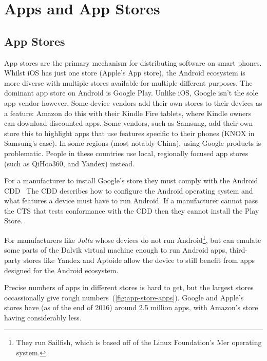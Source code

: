 \documentclass[thesis.tex]{subfiles}
\begin{document}
\chapter{Apps and App Stores}
\label{chap:apps-and-stores}

\section{App Stores}

App stores are the primary mechanism for distributing software on smart phones.
Whilst iOS has just one store (Apple's App store), the Android ecosystem is more diverse with multiple stores available for multiple different purposes.
The dominant app store on Android is Google Play. 
Unlike iOS, Google isn't the sole app vendor however.
Some device vendors add their own stores to their devices as a feature:
Amazon do this with their Kindle Fire tablets, where Kindle owners can download discounted apps.
Some vendors, such as Samsung, add their own store this to highlight apps that use features specific to their phones (KNOX in Samsung's case).
In some regions (most notably China), using Google products is problematic. People in these countries use local, regionally focused app stores (such as QiHoo360, and Yandex) instead.

For a manufacturer to install Google's store they must
comply with the Android \ac{CDD}~\cite{google_android_2016}  The \ac{CDD} describes how to configure the
Android operating system and what features a device must
have to run Android.  If a manufacturer cannot pass the \ac{CTS} that tests
conformance with the \ac{CDD} then they cannot install the Play Store.

For manufacturers like \emph{Jolla} whose devices do not run
Android\footnote{They run Sailfish, which is based off of the Linux Foundation's
Mer operating system.}, but can emulate some parts of the Dalvik virtual machine
enough to run Android apps, third-party stores like Yandex and Aptoide allow the
device to still benefit from apps designed for the Android ecosystem.

Precise numbers of apps in different stores is hard to get, but the largest stores occassionally give rough numbers~(\autoref{fig:app-store-apps}).
Google and Apple's stores have (as of the end of 2016) around 2.5 million apps, with Amazon's store having considerably less.
\end{document}
